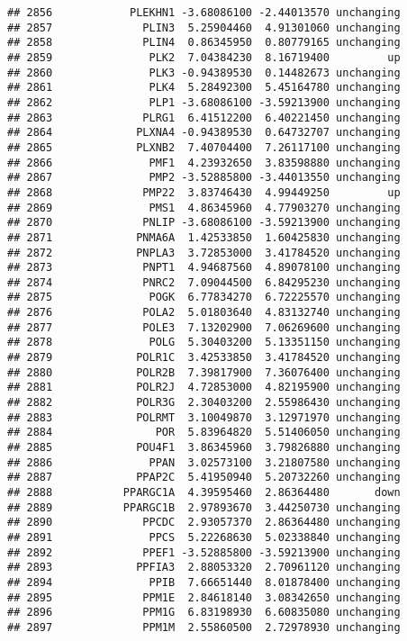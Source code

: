 \documentclass[]{article}
\begin{document}
\begin{verbatim}
## 2856            PLEKHN1 -3.68086100 -2.44013570 unchanging
## 2857              PLIN3  5.25904460  4.91301060 unchanging
## 2858              PLIN4  0.86345950  0.80779165 unchanging
## 2859               PLK2  7.04384230  8.16719400         up
## 2860               PLK3 -0.94389530  0.14482673 unchanging
## 2861               PLK4  5.28492300  5.45164780 unchanging
## 2862               PLP1 -3.68086100 -3.59213900 unchanging
## 2863              PLRG1  6.41512200  6.40221450 unchanging
## 2864             PLXNA4 -0.94389530  0.64732707 unchanging
## 2865             PLXNB2  7.40704400  7.26117100 unchanging
## 2866               PMF1  4.23932650  3.83598880 unchanging
## 2867               PMP2 -3.52885800 -3.44013550 unchanging
## 2868              PMP22  3.83746430  4.99449250         up
## 2869               PMS1  4.86345960  4.77903270 unchanging
## 2870              PNLIP -3.68086100 -3.59213900 unchanging
## 2871             PNMA6A  1.42533850  1.60425830 unchanging
## 2872             PNPLA3  3.72853000  3.41784520 unchanging
## 2873              PNPT1  4.94687560  4.89078100 unchanging
## 2874              PNRC2  7.09044500  6.84295230 unchanging
## 2875               POGK  6.77834270  6.72225570 unchanging
## 2876              POLA2  5.01803640  4.83132740 unchanging
## 2877              POLE3  7.13202900  7.06269600 unchanging
## 2878               POLG  5.30403200  5.13351150 unchanging
## 2879             POLR1C  3.42533850  3.41784520 unchanging
## 2880             POLR2B  7.39817900  7.36076400 unchanging
## 2881             POLR2J  4.72853000  4.82195900 unchanging
## 2882             POLR3G  2.30403200  2.55986430 unchanging
## 2883             POLRMT  3.10049870  3.12971970 unchanging
## 2884                POR  5.83964820  5.51406050 unchanging
## 2885             POU4F1  3.86345960  3.79826880 unchanging
## 2886               PPAN  3.02573100  3.21807580 unchanging
## 2887             PPAP2C  5.41950940  5.20732260 unchanging
## 2888           PPARGC1A  4.39595460  2.86364480       down
## 2889           PPARGC1B  2.97893670  3.44250730 unchanging
## 2890              PPCDC  2.93057370  2.86364480 unchanging
## 2891               PPCS  5.22268630  5.02338840 unchanging
## 2892              PPEF1 -3.52885800 -3.59213900 unchanging
## 2893             PPFIA3  2.88053320  2.70961120 unchanging
## 2894               PPIB  7.66651440  8.01878400 unchanging
## 2895              PPM1E  2.84618140  3.08342650 unchanging
## 2896              PPM1G  6.83198930  6.60835080 unchanging
## 2897              PPM1M  2.55860500  2.72978930 unchanging

\end{verbatim}
\end{document}
